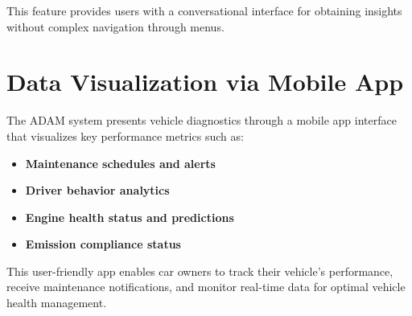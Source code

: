This feature provides users with a conversational interface for obtaining insights without complex navigation through menus.

\section{Data Visualization via Mobile App}
The ADAM system presents vehicle diagnostics through a mobile app interface that visualizes key performance metrics such as:
\begin{itemize}
    \item \textbf{Maintenance schedules and alerts}
    \item \textbf{Driver behavior analytics}
    \item \textbf{Engine health status and predictions}
    \item \textbf{Emission compliance status}
\end{itemize}

This user-friendly app enables car owners to track their vehicle's performance, receive maintenance notifications, and monitor real-time data for optimal vehicle health management.
